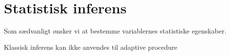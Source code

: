 \chapter{Statistisk inferens} \label{kap:statistisk_inferens}
Som sædvanligt ønsker vi at bestemme variablernes statistiske egenskaber.
 

Klassisk inferens kan ikke anvendes til adaptive procedure


